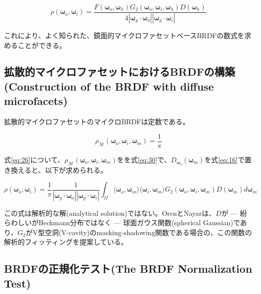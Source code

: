 \documentclass[a4j,xelatex,ja=standard]{bxjsarticle}
\begin{document}
\begin{equation}
    \rho(\boldsymbol{\omega}_o, \boldsymbol{\omega}_i) = \frac{F(\boldsymbol{\omega}_o, \boldsymbol{\omega}_h) G_2(\boldsymbol{\omega}_o, \boldsymbol{\omega}_i, \boldsymbol{\omega}_h) D(\boldsymbol{\omega}_h)}{4|\boldsymbol{\omega}_g \cdot \boldsymbol{\omega}_o| |\boldsymbol{\omega}_g \cdot \boldsymbol{\omega}_i|}
    \label{eq:29}
\end{equation}

これにより、よく知られた、鏡面的マイクロファセットベースBRDFの数式を求めることができる。

\subsection{拡散的マイクロファセットにおけるBRDFの構築(Construction of the BRDF with diffuse microfacets)}

拡散的マイクロファセットのマイクロBRDFは定数である。

\begin{equation}
    \rho_{\mathcal M}(\boldsymbol{\omega}_o, \boldsymbol{\omega}_i, \boldsymbol{\omega}_m) = \frac{1}{\pi}
    \label{eq:30}
\end{equation}

式\eqref{eq:26}について、$\rho_{\mathcal M}(\boldsymbol{\omega}_o, \boldsymbol{\omega}_i, \boldsymbol{\omega}_m)$をを式\eqref{eq:30}で、$D_{\boldsymbol{\omega}_o}(\boldsymbol{\omega}_m)$を式\eqref{eq:16}で置き換えると、以下が求められる。

\begin{equation}
    \rho(\boldsymbol{\omega}_o, \boldsymbol{\omega}_i) = \frac{1}{\pi} \frac{1}{|\boldsymbol{\omega}_g \cdot \boldsymbol{\omega}_o| |\boldsymbol{\omega}_g \cdot \boldsymbol{\omega}_i|} \int_{\Omega} \langle \boldsymbol{\omega}_o, \boldsymbol{\omega}_m \rangle \langle \boldsymbol{\omega}_i, \boldsymbol{\omega}_m \rangle G_2(\boldsymbol{\omega}_o, \boldsymbol{\omega}_i, \boldsymbol{\omega}_m) D(\boldsymbol{\omega}_m) d\boldsymbol{\omega}_m
    \label{eq:31}
\end{equation}

この式は解析的な解(analytical solution)ではない。OrenとNayarは、$D$が --- 紛らわしいがBeckmann分布ではなく --- 球面ガウス関数(spherical Gaussian)であり、$G_2$がV型空洞(V-cavity)のmasking-shadowing関数である場合の、この関数の解析的フィッティングを提案している。

\subsection{BRDFの正規化テスト(The BRDF Normalization Test)}
\end{document}
